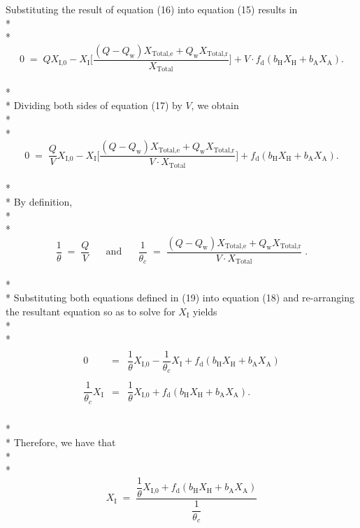 \documentclass[]{article}
\begin{document}
Substituting the result of equation (16) into equation (15) results in \\* \\* 
\begin{equation}
0 \; = \; QX_{\text{I,0}} - X_{\text{I}} \Bigg[\dfrac{(Q-Q_{\text{w}})X_{\text{Total,e}} + Q_{\text{w}}X_{\text{Total,r}}}{X_{\text{Total}}}\Bigg]  + V \cdot f_{\text{d}}(b_{\text{H}}X_{\text{H}}+b_{\text{A}}X_{\text{A}}).
\end{equation} \\* \\* 
Dividing both sides of equation (17) by $V$, we obtain \\* \\* 
\begin{equation}
0 \; = \; \dfrac{Q}{V}X_{\text{I,0}} - X_{\text{I}} \Bigg[\dfrac{(Q-Q_{\text{w}})X_{\text{Total,e}} + Q_{\text{w}}X_{\text{Total,r}}}{V \cdot X_{\text{Total}}}\Bigg]  + f_{\text{d}}(b_{\text{H}}X_{\text{H}}+b_{\text{A}}X_{\text{A}}).
\end{equation} \\* \\* 
By definition, \\* \\* 
\begin{equation}
\dfrac{1}{\theta} \; = \; \dfrac{Q}{V} \; \; \; \; \; \;  \text{and} \; \; \; \; \; \; \dfrac{1}{\theta_c} \; = \; \dfrac{(Q-Q_{\text{w}})X_{\text{Total,e}} + Q_{\text{w}}X_{\text{Total,r}}}{V \cdot X_{\text{Total}}} \; .
\end{equation} \\* \\* 
Substituting both equations defined in (19) into equation (18) and re-arranging the resultant equation so as to solve for $X_{\text{I}}$ yields \\* \\* 
\begin{align}
\nonumber
\begin{array}{rcl}
0 &=& \dfrac{1}{\theta}X_{\text{I,0}} - \dfrac{1}{\theta_c}X_{\text{I}} + f_{\text{d}}(b_{\text{H}}X_{\text{H}}+b_{\text{A}}X_{\text{A}}) \\ \\
\dfrac{1}{\theta_c}X_{\text{I}} &=& \dfrac{1}{\theta}X_{\text{I,0}} + f_{\text{d}}(b_{\text{H}}X_{\text{H}}+b_{\text{A}}X_{\text{A}}).
\end{array}
\end{align}  \\* \\* 
Therefore, we have that \\* \\* 
\begin{equation}
\nonumber
\boxed{X_{\text{I}} \; = \; \dfrac{\dfrac{1}{\theta}X_{\text{I,0}} + f_{\text{d}}(b_{\text{H}}X_{\text{H}}+b_{\text{A}}X_{\text{A}})}{\dfrac{1}{\theta_c}}}
\end{equation}
\newpage
\end{document}
